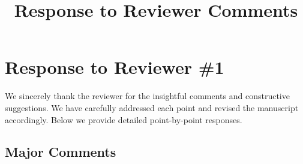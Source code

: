 \documentclass[12pt]{article}
\title{Response to Reviewer Comments}
\date{}
\begin{document}
\maketitle

\section*{Response to Reviewer \#1}

We sincerely thank the reviewer for the insightful comments and constructive suggestions. We have carefully addressed each point and revised the manuscript accordingly. Below we provide detailed point-by-point responses.

\subsection*{Major Comments}
\end{document}
